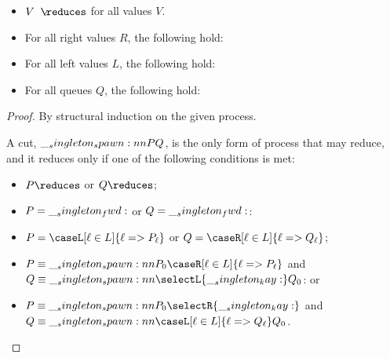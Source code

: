\begin{conjecture}\leavevmode
  \begin{itemize}[nosep]
  \item $V \longarrownot\reduces$ for all values $V$.
  \item For all right values $R$, the following hold:
  \item For all left values $L$, the following hold:
  \item For all queues $Q$, the following hold:
  \end{itemize}
\end{conjecture}
\begin{proof}
  By structural induction on the given process.

  A cut, $\__singleton_spawn:nn {P} {Q}$, is the only form of process that may reduce, and it reduces only if one of the following conditions is met:
  \begin{itemize}
  \item $P \reduces$ or $Q \reduces$;
  \item $P =\__singleton_fwd:$ or $Q=\__singleton_fwd:$:
  \item $P = \caseL[\ell \in L]{\ell => P_{\ell}}$ or $Q = \caseR[\ell \in L]{\ell => Q_{\ell}}$;
  \item $P \equiv \spawn{P_0}{\caseR[\ell \in L]{\ell => P_{\ell}}}$ and $Q \equiv \spawn{\selectL{\kay}}{Q_0}$: or
  \item $P \equiv \spawn{P_0}{\selectR{\kay}}$ and $Q \equiv \spawn{\caseL[\ell \in L]{\ell => Q_{\ell}}}{Q_0}$.
  \end{itemize}
\end{proof}

